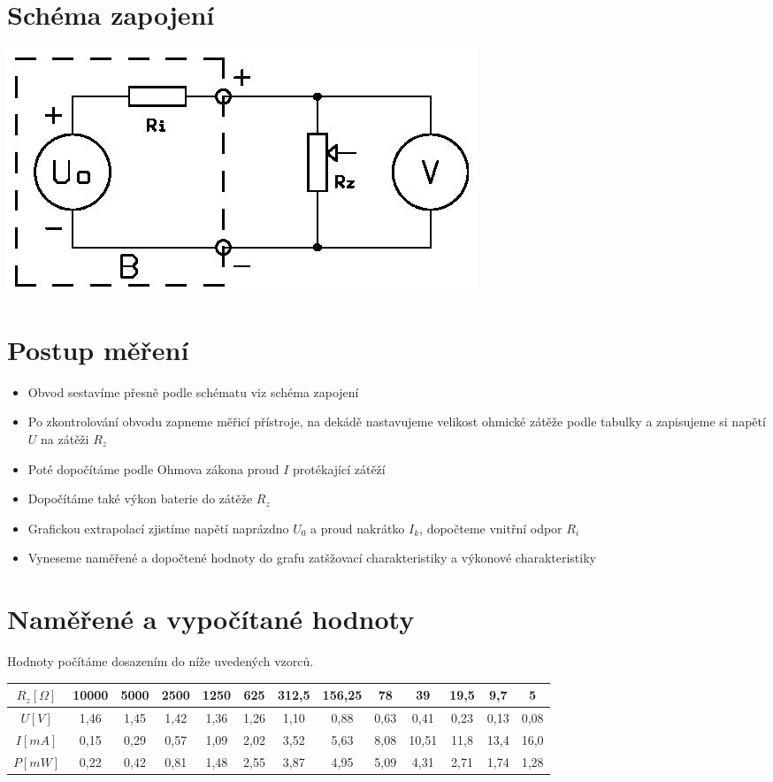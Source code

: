 \documentclass[12pt]{article} %
\begin{document}
\section{Schéma zapojení}
\includegraphics[scale=0.7]{schema.jpg}

\section{Postup měření}
\begin{itemize}
\item Obvod sestavíme přesně podle schématu viz schéma zapojení
\item Po zkontrolování obvodu zapneme měřicí přístroje, na dekádě nastavujeme velikost ohmické zátěže podle tabulky a zapisujeme si napětí $U$ na zátěži $R_z$
\item Poté dopočítáme podle Ohmova zákona proud $I$ protékající zátěží
\item Dopočítáme také výkon baterie do zátěže $R_z$
\item Grafickou extrapolací zjistíme napětí naprázdno $U_0$ a proud nakrátko $I_k$, dopočteme vnitřní odpor $R_i$
\item Vyneseme naměřené a dopočtené hodnoty do grafu zatšžovací charakteristiky a výkonové charakteristiky
\end{itemize}

\section{Naměřené a vypočítané hodnoty}
Hodnoty počítáme dosazením do níže uvedených vzorců.
\begin{tabular}{|c|c|c|c|c|c|c|c|c|c|c|c|c|}
\hline 
$R_z[\Omega]$ & 10000 & 5000 & 2500 & 1250 & 625 & 312,5 & 156,25 & 78 & 39 & 19,5 & 9,7 & 5 \\ 
\hline 
$U[V]$ & 1,46 & 1,45 & 1,42 & 1,36 & 1,26 & 1,10 & 0,88 & 0,63 & 0,41 & 0,23 & 0,13 & 0,08 \\ 
\hline 
$I[mA]$ & 0,15 & 0,29 & 0,57 & 1,09 & 2,02 & 3,52 & 5,63 & 8,08 & 10,51 & 11,8 & 13,4 & 16,0 \\ 
\hline 
$P[mW]$ & 0,22 & 0,42 & 0,81 & 1,48 & 2,55 & 3,87 & 4,95 & 5,09 & 4,31 & 2,71 & 1,74 & 1,28 \\ 
\hline
\end{tabular}
\\[0.5cm]
\end{document}
